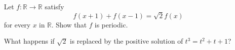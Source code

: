 Let $f : \mathbb{R} \to \mathbb{R}$ satisfy
\[
f(x+1) + f(x-1) = \sqrt{2}f(x)
\]
for every $x$ in $\mathbb{R}$. Show that $f$ is periodic.

What happens if $\sqrt{2}$ is replaced by the positive solution of $t^3 = t^2 + t + 1$?
